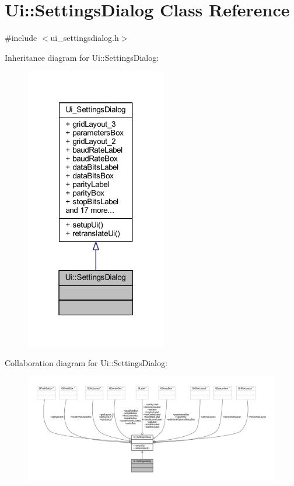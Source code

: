 \hypertarget{a00023}{\section{Ui\+:\+:Settings\+Dialog Class Reference}
\label{a00023}
}


{\ttfamily \#include $<$ui\+\_\+settingsdialog.\+h$>$}



Inheritance diagram for Ui\+:\+:Settings\+Dialog\+:
\nopagebreak
\begin{figure}[H]
\begin{center}
\leavevmode
\includegraphics[width=175pt]{dc/d50/a00332}
\end{center}
\end{figure}


Collaboration diagram for Ui\+:\+:Settings\+Dialog\+:
\nopagebreak
\begin{figure}[H]
\begin{center}
\leavevmode
\includegraphics[width=350pt]{d2/d0a/a00333}
\end{center}
\end{figure}

